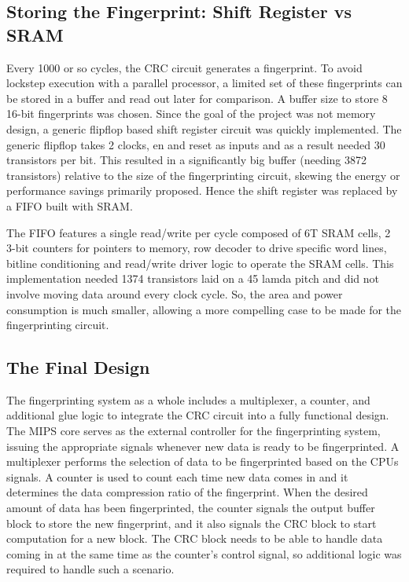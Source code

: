 \documentclass[12pt,journal,compsoc]{IEEEtran}
\begin{document}
\subsection{Storing the Fingerprint: Shift Register vs SRAM}
Every 1000 or so cycles, the CRC circuit generates a fingerprint. To avoid lockstep execution with a parallel processor, a limited set of these fingerprints can be stored in a buffer and read out later for comparison. A buffer size to store 8 16-bit fingerprints was chosen. Since the goal of the project was not memory design, a generic flipflop based shift register circuit was quickly implemented. The generic flipflop takes 2 clocks, en and reset as inputs and as a result needed 30 transistors per bit. This resulted in a significantly big buffer (needing 3872 transistors) relative to the size of the fingerprinting circuit, skewing the energy or performance savings primarily proposed. Hence the shift register was replaced by a FIFO built with SRAM. 

The FIFO features a single read/write per cycle composed of 6T SRAM cells, 2 3-bit counters for pointers to memory, row decoder to drive specific word lines, bitline conditioning and read/write driver logic to operate the SRAM cells. This implementation needed 1374 transistors laid on a 45 lamda pitch and did not involve moving data around every clock cycle. So, the area and power consumption is much smaller, allowing a more compelling case to be made for the fingerprinting circuit. 


\subsection{The Final Design}
The fingerprinting system as a whole includes a multiplexer, a counter, and additional glue logic to integrate the CRC circuit into a fully functional design. The MIPS core serves as the external controller for the fingerprinting system, issuing the appropriate signals whenever new data is ready to be fingerprinted. A multiplexer performs the selection of data to be fingerprinted based on the CPUs signals. A counter is used to count each time new data comes in and it determines the data compression ratio of the fingerprint. When the desired amount of data has been fingerprinted, the counter signals the output buffer block to store the new fingerprint, and it also signals the CRC block to start computation for a new block. The CRC block needs to be able to handle data coming in at the same time as the counter's control signal, so additional logic was required to handle such a scenario. 
\end{document}
